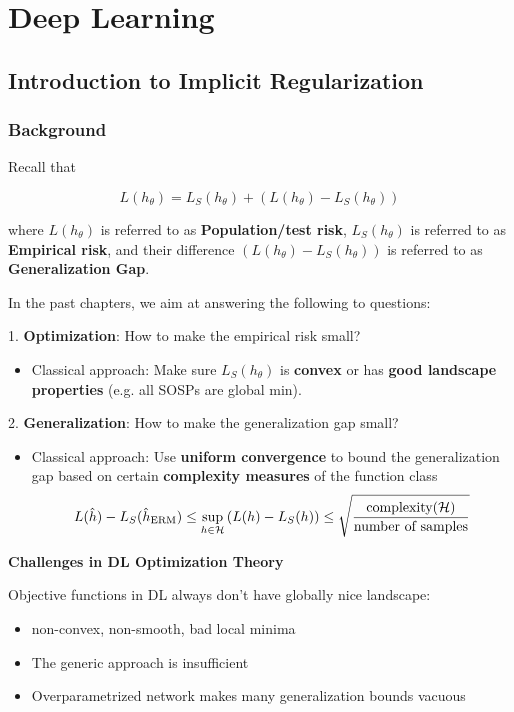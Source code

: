 
\part{Deep Learning}


\chapter{Introduction to Implicit Regularization}

\section{Background}

Recall that 

\[
    L(h_\theta) = L_S (h_\theta) + \left( L(h_\theta) - L_S (h_\theta)   \right)
\]

where \(L(h_\theta)\) is referred to as \textbf{Population/test risk}, \(L_S(h_\theta)\) is 
referred to as \textbf{Empirical risk}, and their difference  \(\left( L(h_\theta) - L_S (h_\theta)   \right)\)
is referred to as \textbf{Generalization Gap}. 

In the past chapters, we aim at answering the following to questions: 

1. \textbf{Optimization}: How to make the empirical risk small? 
\begin{itemize}
    \item Classical approach: Make sure \(L_S(h_\theta)\) is \textbf{convex} or has 
    \textbf{good landscape properties} (e.g. all SOSPs are global min). 
\end{itemize}

2. \textbf{Generalization}: How to make the generalization gap small? 

\begin{itemize}
    \item Classical approach: Use \textbf{uniform convergence} to bound the generalization gap 
    based on certain \textbf{complexity measures} of the function class 
    \[
        L(\hat{h}) - L_S (\hat{h}_{\text{ERM}}) \leq \sup_{h \in \mathcal{H}} \left(L(h) - L_S(h)\right)
        \leq \sqrt{ \frac{\text{complexity}(\mathcal{H})}{\text{number of samples}}  } 
    \]
\end{itemize}



\textbf{Challenges in DL Optimization Theory}

Objective functions in DL always don't have globally nice landscape: 
\begin{itemize}
    \item non-convex, non-smooth, bad local minima 
    \item The generic approach is insufficient
    \item Overparametrized network makes many generalization bounds vacuous 
\end{itemize}

